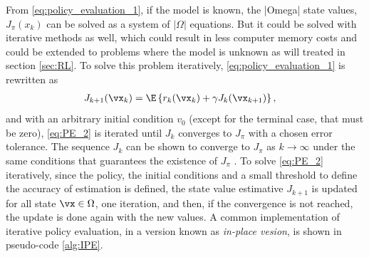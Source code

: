From \eqref{eq:policy_evaluation_1}, if the model is known, the |Omega| state values, $J_\pi(x_k)$ can be solved as a system of $|\Omega|$ equations. But it could be solved with iterative methods as well, which could result in less computer memory costs and could be extended to problems where the model is unknown as will treated in section \ref{sec:RL}.
To solve this problem iteratively, \eqref{eq:policy_evaluation_1} is rewritten as
\begin{align}
  J_{k+1}(\vx_k) &= \E\left\{ r_k(\vx_k) + \gamma J_k(\vx_{k+1})  \right\} 
\label{eq:PE_2},
\end{align}
and with an arbitrary initial condition $v_0$ (except for the terminal case, that must be zero), \eqref{eq:PE_2} is iterated until $J_k$ converges to $J_\pi$ with a chosen error tolerance. The sequence $J_k$ can be shown to converge to $J_\pi$ as $k \to \infty$ under the same conditions that guarantees the existence of $J_\pi$ 
\citep{sutton2018}. 
To solve \eqref{eq:PE_2} iteratively, since the policy, the initial conditions and a small threshold to define the accuracy of estimation is defined, the state value estimative $J_{k+1}$ is updated for all state $\vx \in \Omega$, one iteration, and then, if the convergence is not reached, the update is done again with the new values. A common implementation of iterative policy evaluation, 
in a version known as \textit{in-place vesion}, is shown in pseudo-code \ref{alg:IPE}.



